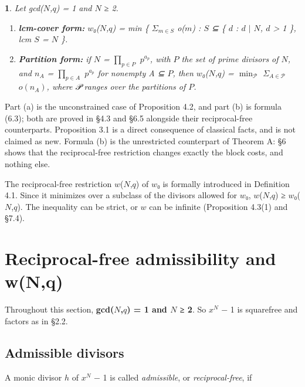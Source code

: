 \documentclass[pdflatex,sn-mathphys-num]{sn-jnl}
\providecommand{\tightlist}{\setlength{\itemsep}{0pt}\setlength{\parskip}{0pt}}
\theoremstyle{thmstyleone}
\newcommand{\thmxname}{}
\newtheorem*{thmxinner}{\thmxname}
\newenvironment{thmx}[1]{\renewcommand{\thmxname}{#1}\begin{thmxinner}}{\end{thmxinner}}
\theoremstyle{thmstylethree}
\begin{document}
\begin{thmx}{Proposition 3.1 (classical forms of \(w\)₀)}

Let gcd(\(N\),\(q\)) = 1 and \(N\) ≥ 2.

\begin{enumerate}
\def\labelenumi{(\alph{enumi})}
\tightlist
\item \textbf{lcm-cover form:} \(w\)₀(\(N\),\(q\)) = min \{ \(Σ_{m∈S}\) o(\(m\)) : \(S\) ⊆ \{ \(d\) : \(d\) \(\mid\) \(N\), \(d\) \textgreater{} 1 \}, lcm \(S\) = \(N\) \}.
\item \textbf{Partition form:} if \(N\) = \(∏_{p∈P}\) \(p^{a_p}\), with \(P\) the set of prime divisors of \(N\), and \(n_A\) = \(∏_{p∈A}\) \(p^{a_p}\) for nonempty A ⊆ \(P\), then \(w\)₀(\(N\),\(q\)) = \(\operatorname{min}_𝒫\) \(Σ_{A∈𝒫}\) \(o(n_A)\), where 𝒫 ranges over the partitions of \(P\).
\end{enumerate}

\end{thmx}

Part (a) is the unconstrained case of Proposition 4.2, and part (b) is formula (6.3); both are proved in §4.3 and §6.5 alongside their reciprocal-free counterparts. Proposition 3.1 is a direct consequence of classical facts, and is not claimed as new. Formula (b) is the unrestricted counterpart of Theorem A: §6 shows that the reciprocal-free restriction changes exactly the block costs, and nothing else.

The reciprocal-free restriction \(w\)(\(N\),\(q\)) of \(w\)₀ is formally introduced in Definition 4.1. Since it minimizes over a subclass of the divisors allowed for \(w\)₀, \(w\)(\(N\),\(q\)) ≥ \(w\)₀(\(N\),\(q\)). The inequality can be strict, or \(w\) can be infinite (Proposition 4.3(1) and §7.4).

\section{Reciprocal-free admissibility and w(N,q)}

Throughout this section, \textbf{gcd(\(N\),\(q\)) = 1 and \(N\) ≥ 2}. So \(x^N\) − 1 is squarefree and factors as in §2.2.

\subsection{Admissible divisors}

A monic divisor \(h\) of \(x^N\) − 1 is called \emph{admissible}, or \emph{reciprocal-free}, if
\end{document}
